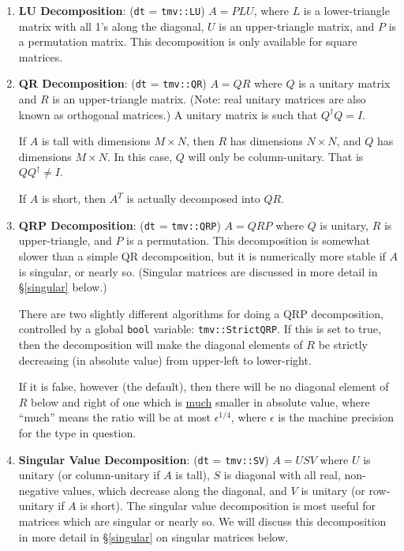 \documentclass[twoside,letterpaper,11pt]{article}
\renewcommand{\tt}[1]{{\texttt {#1}}}
\begin{document}
\begin{enumerate}
\item
\textbf{LU Decomposition}: 
(\tt{dt} = \tt{tmv::LU}) $A = P L U$, where $L$ is a lower-triangle 
matrix with all 1's along the diagonal, $U$ is an upper-triangle matrix, 
and $P$ is a permutation matrix.  This decomposition is only available for 
square matrices.

\item
\textbf{QR Decomposition}: 
(\tt{dt} = \tt{tmv::QR}) $A = Q R$ where $Q$ is a unitary matrix
and $R$ is an upper-triangle matrix.  (Note: real unitary matrices are
also known as orthogonal matrices.)  A unitary matrix is such that
$Q^\dagger Q = I$. 

If $A$ is tall with dimensions $M \times N$, 
then $R$ has dimensions $N \times N$, and $Q$
has dimensions $M \times N$.  In this case, $Q$ will
only be column-unitary.  That is $Q Q^\dagger \neq I$.

If $A$ is short, then $A^T$ is actually decomposed into $Q R$.

\item
\textbf{QRP Decomposition}: 
(\tt{dt} = \tt{tmv::QRP}) $A = Q R P$ where $Q$ is unitary, $R$ is 
upper-triangle, and $P$ is a permutation.  This decomposition is somewhat
slower than a simple QR decomposition, but it is numerically more stable if
$A$ is singular, or nearly so.  
(Singular matrices are discussed in more detail in \S\ref{singular} below.)

There are two slightly different algorithms for doing a QRP decomposition, controlled by a global
\tt{bool} variable: \tt{tmv::StrictQRP}.
If this is set to true, then the decomposition will make the diagonal elements
of $R$ be strictly decreasing (in absolute value) from upper-left to lower-right.

If it is false, however (the default), then there will be no diagonal element
of $R$ below and right of one which is \underline{much} smaller in absolute value,
where ``much'' means the ratio will be at most $\epsilon^{1/4}$, where 
$\epsilon$ is the machine precision for the type in question.

\item
\textbf{Singular Value Decomposition}: 
(\tt{dt} = \tt{tmv::SV}) $A = U S V$ where $U$ is unitary
(or column-unitary if $A$ is tall), $S$ is diagonal with all real, non-negative 
values, which decrease along the diagonal, and $V$ is unitary 
(or row-unitary if $A$ is short).  The singular value decomposition is most useful
for matrices which are singular or nearly so.  
We will discuss this decomposition in more detail in \S\ref{singular} on
singular matrices below.

\end{enumerate}
\end{document}
